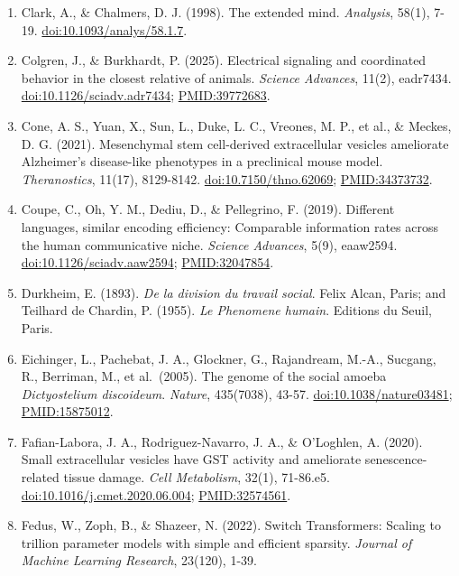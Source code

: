 \documentclass[10pt,letterpaper]{article}
\begin{document}
\begin{enumerate}
  \href{https://doi.org/10.1038/s43587-024-00612-4}{doi:10.1038/s43587-024-00612-4};
  \url{PMID:38627524}.
\item
  Clark, A., \& Chalmers, D. J. (1998). The extended mind.
  \emph{Analysis}, 58(1), 7-19.
  \href{https://doi.org/10.1093/analys/58.1.7}{doi:10.1093/analys/58.1.7}.
\item
  Colgren, J., \& Burkhardt, P. (2025). Electrical signaling and
  coordinated behavior in the closest relative of animals. \emph{Science
  Advances}, 11(2), eadr7434.
  \href{https://doi.org/10.1126/sciadv.adr7434}{doi:10.1126/sciadv.adr7434};
  \url{PMID:39772683}.
\item
  Cone, A. S., Yuan, X., Sun, L., Duke, L. C., Vreones, M. P., et al.,
  \& Meckes, D. G. (2021). Mesenchymal stem cell-derived extracellular
  vesicles ameliorate Alzheimer's disease-like phenotypes in a
  preclinical mouse model. \emph{Theranostics}, 11(17), 8129-8142.
  \href{https://doi.org/10.7150/thno.62069}{doi:10.7150/thno.62069};
  \url{PMID:34373732}.
\item
  Coupe, C., Oh, Y. M., Dediu, D., \& Pellegrino, F. (2019). Different
  languages, similar encoding efficiency: Comparable information rates
  across the human communicative niche. \emph{Science Advances}, 5(9),
  eaaw2594.
  \href{https://doi.org/10.1126/sciadv.aaw2594}{doi:10.1126/sciadv.aaw2594};
  \url{PMID:32047854}.
\item
  Durkheim, E. (1893). \emph{De la division du travail social}. Felix
  Alcan, Paris; and Teilhard de Chardin, P. (1955). \emph{Le Phenomene
  humain}. Editions du Seuil, Paris.
\item
  Eichinger, L., Pachebat, J. A., Glockner, G., Rajandream, M.-A.,
  Sucgang, R., Berriman, M., et al.~(2005). The genome of the social
  amoeba \emph{Dictyostelium discoideum}. \emph{Nature}, 435(7038),
  43-57.
  \href{https://doi.org/10.1038/nature03481}{doi:10.1038/nature03481};
  \url{PMID:15875012}.
\item
  Fafian-Labora, J. A., Rodriguez-Navarro, J. A., \& O'Loghlen, A.
  (2020). Small extracellular vesicles have GST activity and ameliorate
  senescence-related tissue damage. \emph{Cell Metabolism}, 32(1),
  71-86.e5.
  \href{https://doi.org/10.1016/j.cmet.2020.06.004}{doi:10.1016/j.cmet.2020.06.004};
  \url{PMID:32574561}.
\item
  Fedus, W., Zoph, B., \& Shazeer, N. (2022). Switch Transformers:
  Scaling to trillion parameter models with simple and efficient
  sparsity. \emph{Journal of Machine Learning Research}, 23(120), 1-39.

\end{enumerate}
\end{document}
